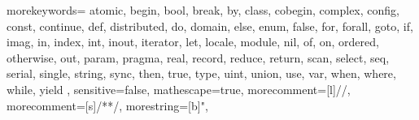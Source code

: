   {
    morekeywords={
      atomic,
      begin, bool, break, by,
      class, cobegin, complex, config, const, continue,
      def, distributed, do, domain,
      else, enum,
      false, for, forall,
      goto,
      if, imag, in, index, int, inout, iterator,
      let, locale,
      module,
      nil,
      of, on, ordered, otherwise, out,
      param, pragma,
      real, record, reduce, return,
      scan, select, seq, serial, single, string, sync,
      then, true, type,
      uint, union, use,
      var,
      when, where, while,
      yield
    },
    sensitive=false,
    mathescape=true,
    morecomment=[l]{//},
    morecomment=[s]{/*}{*/},
    morestring=[b]",
}


\newcommand{\chpl}[1]{\lstinline[language=chapel,basicstyle=\ttfamily,keywordstyle=]!#1!}
\newcommand{\varname}[1]{\emph{#1}}
\newcommand{\typename}[1]{\emph{#1}}
\newcommand{\fnname}[1]{\chpl{#1}}





\newenvironment{protobody}{\begin{quote}}{\end{quote}}
